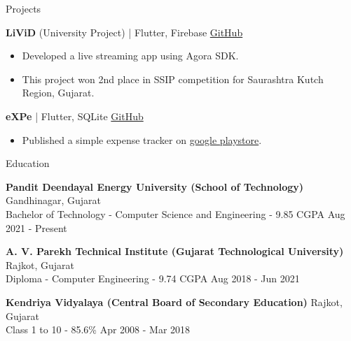 \documentclass{resume}
\begin{document}
\begin{rSection}{Projects}
    \item \textbf{LiViD} (University Project) | {Flutter, Firebase}
    \hfill \href{https://github.com/JayNakum/LiViD}{GitHub}
    \begin{itemize}
        \setlength\itemsep{-0.5em}
        \item Developed a live streaming app using Agora SDK.
        \item This project won 2nd place in SSIP competition for Saurashtra Kutch Region, Gujarat.
    \end{itemize}

    \item \textbf{eXPe} | {Flutter, SQLite}
    \hfill \href{https://github.com/JayNakum/eXPe}{GitHub}
    \begin{itemize}
        \setlength\itemsep{-0.5em}
        \item Published a simple expense tracker on \href{https://play.google.com/store/apps/details?id=io.github.jaynakum.expe&pcampaignid=pcampaignidMKT-Other-global-all-co-prtnr-py-PartBadge-Mar2515-1}{google playstore}.
    \end{itemize}
\end{rSection}

\newpage

\begin{rSection}{Education}
\vspace{-1em}
    \item \textbf{Pandit Deendayal Energy University (School of Technology)}
    \hfill Gandhinagar, Gujarat
    \\ Bachelor of Technology - Computer Science and Engineering - 9.85 CGPA
    \hfill {Aug 2021 - Present}

    \item \textbf{A. V. Parekh Technical Institute (Gujarat Technological University)}
    \hfill Rajkot, Gujarat
    \\ Diploma - Computer Engineering - 9.74 CGPA
    \hfill {Aug 2018 - Jun 2021}

    \item \textbf{Kendriya Vidyalaya (Central Board of Secondary Education)}
    \hfill Rajkot, Gujarat
    \\ Class 1 to 10 - 85.6\% 
    \hfill {Apr 2008 - Mar 2018}
\end{rSection}
\end{document}
